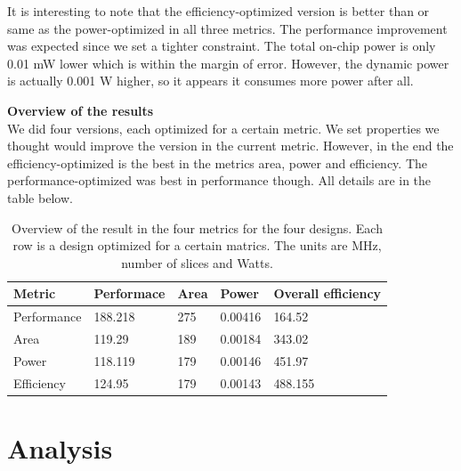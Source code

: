 \documentclass[a4paper,11pt]{article}
\begin{document}

It is interesting to note that the efficiency-optimized version is better than or same as the power-optimized in all three metrics. The performance improvement was expected since we set a tighter constraint. The total on-chip power is only 0.01 mW lower which is within the margin of error. However, the dynamic power is actually 0.001 W higher, so it appears it consumes more power after all.

\textbf{Overview of the results}\\
We did four versions, each optimized for a certain metric. We set properties we thought would improve the version in the current metric. However, in the end the efficiency-optimized is the best in the metrics area, power and efficiency. The performance-optimized was best in performance though. All details are in the table below.

\begin{table}[h!]
  \centering
  \begin{tabular}{|l||l|l|l|l|} \hline
  \textbf{Metric} & \textbf{Performace} & \textbf{Area} & \textbf{Power} & \textbf{Overall efficiency}  \\ \hline
  Performance & 188.218 & 275 & 0.00416 & 164.52 \\
  Area & 119.29 & 189 &0.00184 & 343.02 \\
  Power & 118.119 & 179 & 0.00146 & 451.97 \\
  Efficiency & 124.95 & 179 & 0.00143 & 488.155\\ \hline
  \end{tabular}
  \caption{Overview of the result in the four metrics for the four designs. Each row is a design optimized for a certain matrics. The units are MHz, number of slices and Watts.}
\end{table}

\newpage
\section{Analysis}
\end{document}
